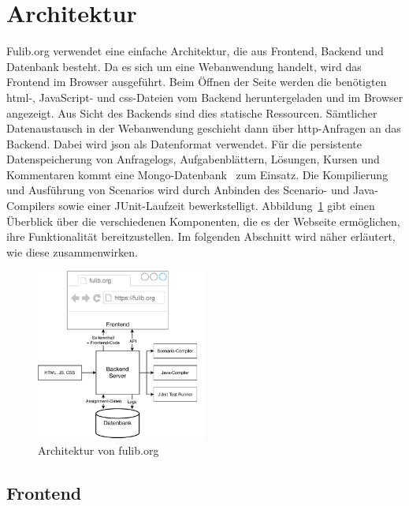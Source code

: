 \section{Architektur}\label{sec:architecture}

Fulib.org verwendet eine einfache Architektur, die aus Frontend, Backend und Datenbank besteht.
Da es sich um eine Webanwendung handelt, wird das Frontend im Browser ausgeführt.
Beim Öffnen der Seite werden die benötigten \ac{html}-, JavaScript- und \ac{css}-Dateien vom Backend heruntergeladen und im Browser angezeigt.
Aus Sicht des Backends sind dies statische Ressourcen.
Sämtlicher Datenaustausch in der Webanwendung geschieht dann über \ac{http}-Anfragen an das Backend.
Dabei wird \ac{json} als Datenformat verwendet.
Für die persistente Datenspeicherung von Anfragelogs, Aufgabenblättern, Lösungen, Kursen und Kommentaren kommt eine Mongo-Datenbank~\cite{mongodb} zum Einsatz.
Die Kompilierung und Ausführung von Scenarios wird durch Anbinden des Scenario- und Java-Compilers sowie einer JUnit-Laufzeit bewerkstelligt.
Abbildung~\ref{fig:website-architecture} gibt einen Überblick über die verschiedenen Komponenten, die es der Webseite ermöglichen, ihre Funktionalität bereitzustellen.
Im folgenden Abschnitt wird näher erläutert, wie diese zusammenwirken.

\begin{figure}
    \centering
    \includegraphics[width=0.5\textwidth]{chapter/fulib.org/img/architecture.pdf}
    \caption{Architektur von fulib.org}
    \label{fig:website-architecture}
\end{figure}

\subsection{Frontend}\label{subsec:frontend}

